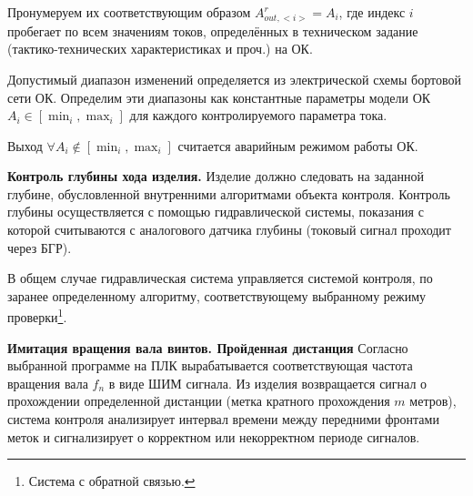 Пронумеруем их соответствующим образом $A^r_{out,<i>} = A_i$,
где индекс $i$ пробегает по всем значениям токов,
определённых в техническом задание (тактико-технических характеристиках и проч.) на ОК.

Допустимый диапазон изменений определяется из электрической схемы бортовой сети ОК.
Определим эти диапазоны как константные параметры модели ОК $A_i \in [\min_i, \max_i]$
для каждого контролируемого параметра тока.

Выход $\forall A_i \notin [\min_i, \max_i]$ считается аварийным режимом работы ОК.

\textbf{}

\textbf{Контроль глубины хода изделия.}
Изделие должно следовать на заданной глубине, обусловленной внутренними алгоритмами объекта контроля.
Контроль глубины осуществляется с помощью гидравлической системы,
показания с которой считываются с аналогового датчика глубины (токовый сигнал проходит через БГР).

В общем случае гидравлическая система управляется системой контроля,
по заранее определенному алгоритму, соответствующему выбранному режиму проверки\footnote{Система с обратной связью.}.

\textbf{}


\textbf{Имитация вращения вала винтов. Пройденная дистанция}
Согласно выбранной программе на ПЛК вырабатывается соответствующая 
частота вращения вала $f_n$ в виде ШИМ сигнала.
Из изделия возвращается сигнал о прохождении определенной дистанции (метка кратного прохождения $m$ метров),
система контроля анализирует интервал времени между передними фронтами меток
и сигнализирует о корректном или некорректном периоде сигналов.
\textbf{}

